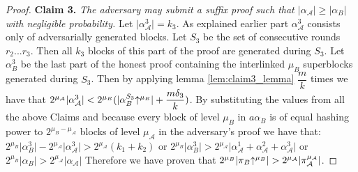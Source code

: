 \begin{proof}
\textbf{Claim 3.} \textit{The adversary may submit a suffix proof such that $\lvert \alpha_\mathcal{A}\rvert \geq \lvert \alpha_B \rvert$ with negligible probability.} Let $ \lvert \alpha_\mathcal{A}^3 \rvert = k_3$. As explained earlier part $\alpha^3_\mathcal{A}$ consists only of adversarially generated blocks. Let $S_3$ be the set of consecutive rounds $r_2...r_3$. Then all $k_3$ blocks of this part of the proof are generated during $S_3$. Let $\alpha^{3}_B$ be the last part of the honest proof containing the interlinked $\mu_B$ superblocks generated during $S_3$. Then by applying lemma \ref{lem:claim3_lemma} $\dfrac{m}{k}$ times we have that $ 2^{\mu_\mathcal{A}}\lvert \alpha^3_\mathcal{A} \rvert < 2^{\mu_B} (\lvert \alpha^{S_3}_{B}\negthickspace\uparrow^{\mu_B} \rvert + \dfrac{m\delta_3}{k})$. By substituting the values from all the above Claims and because every block of level $\mu_B$ in $a\alpha_B$ is of equal hashing power to $2^{\mu_B - \mu_\mathcal{A}}$ blocks of level $\mu_\mathcal{A}$ in the adversary's proof we have that:
$2^{\mu_B} \lvert \alpha{_B^{3}} \rvert - 2^{\mu_\mathcal{A}} \lvert \alpha_\mathcal{A}^{3} \rvert > 2^{\mu_\mathcal{A}}(k_1 + k_2)$
or $2^{\mu_B} \lvert \alpha{_B^{3}} \rvert > 2^{\mu_\mathcal{A}} \lvert \alpha_\mathcal{A}^{1} + \alpha_\mathcal{A}^{2} + \alpha_\mathcal{A}^{3}\rvert $
or $2^{\mu_B} \lvert \alpha{_B} \rvert > 2^{\mu_\mathcal{A}} \lvert \alpha_\mathcal{A} \rvert $
Therefore we have proven that $2^{\mu_B} \lvert \pi_B \negthickspace\uparrow^{\mu_B} \rvert > 2^{\mu_\mathcal{A}} \lvert \pi_\mathcal{A}^{\mu_\mathcal{A}} \rvert$.
\end{proof}
